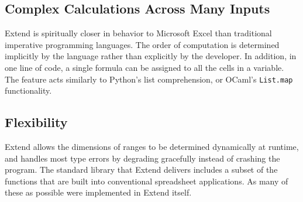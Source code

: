 	\subsection{Complex Calculations Across Many Inputs}
	Extend is spiritually closer in behavior to Microsoft Excel than traditional imperative programming languages. The order of computation is determined implicitly by the language rather than explicitly by the developer. In addition, in one line of code, a single formula can be assigned to all the cells in a variable. The feature acts similarly to Python's list comprehension, or OCaml's \texttt{List.map} functionality.

	\subsection{Flexibility}
	Extend allows the dimensions of ranges to be determined dynamically at runtime, and handles most type errors by degrading gracefully instead of crashing the program. The standard library that Extend delivers includes a subset of the functions that are built into conventional spreadsheet applications. As many of these as possible were implemented in Extend itself.
